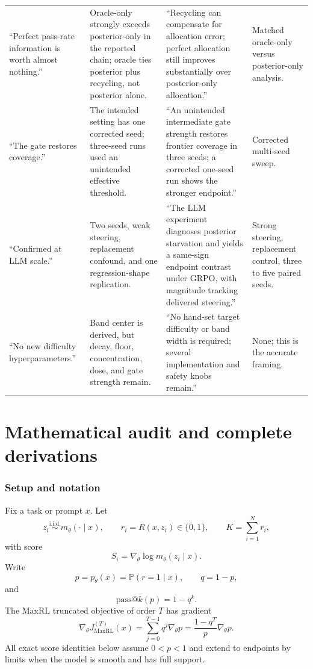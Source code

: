 \documentclass[11pt]{article}
\makeatletter
\newcommand{\Prb}{\mathbb{P}}
\newcommand{\grad}{\nabla_{\!\theta}}
\newcommand{\PassAt}[1]{\mathrm{pass@}#1}
\theoremstyle{definition}
\theoremstyle{remark}
\makeatother
\begin{document}
\begin{longtable}{p{}p{}p{}p{}}
\addlinespace
``Perfect pass-rate information is worth almost nothing.'' & Oracle-only strongly exceeds posterior-only in the reported chain; oracle ties posterior plus recycling, not posterior alone. & ``Recycling can compensate for allocation error; perfect allocation still improves substantially over posterior-only allocation.'' & Matched oracle-only versus posterior-only analysis.\\
\addlinespace
``The gate restores coverage.'' & The intended setting has one corrected seed; three-seed runs used an unintended effective threshold. & ``An unintended intermediate gate strength restores frontier coverage in three seeds; a corrected one-seed run shows the stronger endpoint.'' & Corrected multi-seed sweep.\\
\addlinespace
``Confirmed at LLM scale.'' & Two seeds, weak steering, replacement confound, and one regression-shape replication. & ``The LLM experiment diagnoses posterior starvation and yields a same-sign endpoint contrast under GRPO, with magnitude tracking delivered steering.'' & Strong steering, replacement control, three to five paired seeds.\\
\addlinespace
``No new difficulty hyperparameters.'' & Band center is derived, but decay, floor, concentration, dose, and gate strength remain. & ``No hand-set target difficulty or band width is required; several implementation and safety knobs remain.'' & None; this is the accurate framing.\\
\bottomrule
\end{longtable}
\normalsize

\part{Mathematical audit and complete derivations}

\section{Setup and notation}

Fix a task or prompt $x$. Let
\[
 z_i \overset{\mathrm{i.i.d.}}{\sim} m_\theta(\cdot\mid x),\qquad
 r_i=R(x,z_i)\in\{0,1\},\qquad
 K=\sum_{i=1}^{N}r_i,
\]
with score
\[
 S_i=\grad\log m_\theta(z_i\mid x).
\]
Write
\[
 p=p_\theta(x)=\Prb(r=1\mid x),\qquad q=1-p,
\]
and
\[
 \PassAt{k}(p)=1-q^k.
\]
The MaxRL truncated objective of order $T$ has gradient
\[
 \grad J_{\mathrm{MaxRL}}^{(T)}(x)
 =\sum_{j=0}^{T-1}q^j\grad p
 =\frac{1-q^T}{p}\grad p.
\]
All exact score identities below assume $0<p<1$ and extend to endpoints by limits when the model is smooth and has full support.
\end{document}
